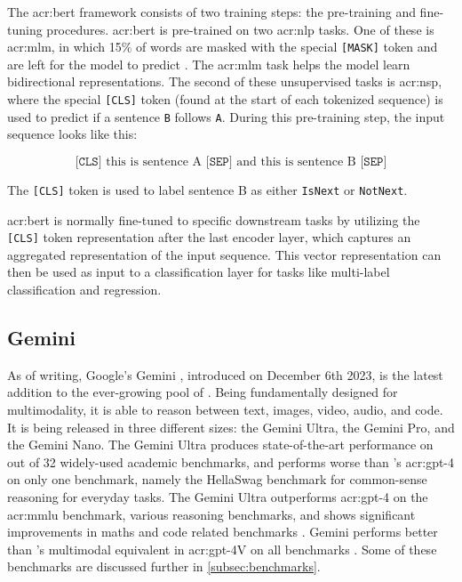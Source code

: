 The \acrshort{acr:bert} framework consists of two training steps: the pre-training and fine-tuning procedures. \acrshort{acr:bert} is pre-trained on two \gls{acr:nlp} tasks. One of these is \gls{acr:mlm}, in which 15\% of words are masked with the special \texttt{[MASK]} token and are left for the model to predict \citep[4]{devlinBERTPretrainingDeep2019}. The \gls{acr:mlm} task helps the model learn bidirectional representations. The second of these unsupervised tasks is \gls{acr:nsp}, where the special \texttt{[CLS]} token (found at the start of each tokenized sequence) is used to predict if a sentence \texttt{B} follows \texttt{A}. During this pre-training step, the input sequence looks like this:

$$
    \texttt{[CLS]} \text{ this is sentence A } \texttt{[SEP]} \text{ and this is sentence B } \texttt{[SEP]}
$$

\noindent The \texttt{[CLS]} token is used to label sentence B as either \texttt{IsNext} or \texttt{NotNext}.

\acrshort{acr:bert} is normally fine-tuned to specific downstream tasks by utilizing the \texttt{[CLS]} token representation after the last encoder layer, which captures an aggregated representation of the input sequence. This vector representation can then be used as input to a classification layer for tasks like multi-label classification and regression.

\subsection{Gemini}\label{subsec:gemini}

As of writing, Google's Gemini \citep{geminiteamGeminiFamilyHighly2023}, introduced on December 6th 2023, is the latest addition to the ever-growing pool of . Being fundamentally designed for multimodality, it is able to reason between text, images, video, audio, and code. It is being released in three different sizes: the Gemini Ultra, the Gemini Pro, and the Gemini Nano. The Gemini Ultra produces state-of-the-art performance on  out of 32 widely-used academic benchmarks, and performs worse than \citeauthor{openaiGPT4TechnicalReport2023}'s \acrshort{acr:gpt}-4 on only one benchmark, namely the HellaSwag benchmark for common-sense reasoning for everyday tasks. The Gemini Ultra outperforms \acrshort{acr:gpt}-4 on the \gls{acr:mmlu} benchmark, various reasoning benchmarks, and shows significant improvements in maths and code related benchmarks  \citep[7]{geminiteamGeminiFamilyHighly2023}. Gemini performs better than \citeauthor{openaiGPT4TechnicalReport2023}'s multimodal equivalent in \acrshort{acr:gpt}-4V on all benchmarks \citep[12]{geminiteamGeminiFamilyHighly2023}. Some of these benchmarks are discussed further in \autoref{subsec:benchmarks}.

